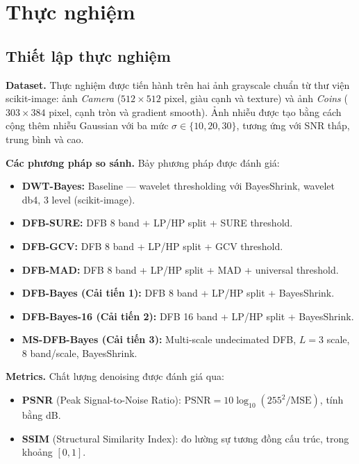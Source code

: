 \section{Thực nghiệm}
\label{sec:experiments}

\subsection{Thiết lập thực nghiệm}

\textbf{Dataset.}
Thực nghiệm được tiến hành trên hai ảnh grayscale chuẩn từ thư viện scikit-image: ảnh \textit{Camera} ($512\times512$ pixel, giàu cạnh và texture) và ảnh \textit{Coins} ($303\times384$ pixel, cạnh tròn và gradient smooth). Ảnh nhiễu được tạo bằng cách cộng thêm nhiễu Gaussian với ba mức $\sigma \in \{10, 20, 30\}$, tương ứng với SNR thấp, trung bình và cao.

\textbf{Các phương pháp so sánh.}
Bảy phương pháp được đánh giá:
\begin{itemize}
    \item \textbf{DWT-Bayes:} Baseline --- wavelet thresholding với BayesShrink, wavelet db4, 3 level (scikit-image).
    \item \textbf{DFB-SURE:} DFB 8 band + LP/HP split + SURE threshold.
    \item \textbf{DFB-GCV:} DFB 8 band + LP/HP split + GCV threshold.
    \item \textbf{DFB-MAD:} DFB 8 band + LP/HP split + MAD + universal threshold.
    \item \textbf{DFB-Bayes (Cải tiến 1):} DFB 8 band + LP/HP split + BayesShrink.
    \item \textbf{DFB-Bayes-16 (Cải tiến 2):} DFB 16 band + LP/HP split + BayesShrink.
    \item \textbf{MS-DFB-Bayes (Cải tiến 3):} Multi-scale undecimated DFB, $L=3$ scale, 8 band/scale, BayesShrink.
\end{itemize}

\textbf{Metrics.}
Chất lượng denoising được đánh giá qua:
\begin{itemize}
    \item \textbf{PSNR} (Peak Signal-to-Noise Ratio): $\text{PSNR} = 10\log_{10}(255^2/\text{MSE})$, tính bằng dB.
    \item \textbf{SSIM} (Structural Similarity Index): đo lường sự tương đồng cấu trúc, trong khoảng $[0, 1]$.
\end{itemize}

